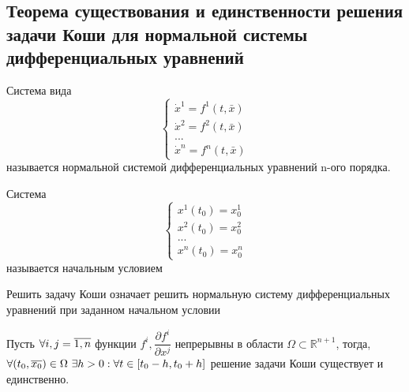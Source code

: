 \subsection{Теорема существования и единственности решения задачи Коши для нормальной системы дифференциальных уравнений}

\begin{definition}
    Система вида
    \begin{equation}
        \label{equ:norm-sys}
        \begin{cases*}
            \dot{x}^1 = f^1(t, \bar{x}) \\
            \dot{x}^2 = f^2(t, \bar{x}) \\
            ...                         \\
            \dot{x}^n = f^n(t, \bar{x})
        \end{cases*}
    \end{equation}
    называется нормальной системой дифференциальных уравнений n-ого порядка.
    
\end{definition}

\begin{definition}
    Система
    \begin{equation}
        \label{equ:init-cond}
        \begin{cases*}
            x^1(t_0) = x_0^1 \\
            x^2(t_0) = x_0^2 \\
            ...              \\
            x^n(t_0) = x_0^n
        \end{cases*}
    \end{equation}
    называется начальным условием
\end{definition}	

\begin{proposition}
    Решить задачу Коши означает решить нормальную систему дифференциальных уравнений при заданном начальном условии
\end{proposition}

\begin{theorem} \label{ОсновнаяТеорема}
    Пусть $\forall i, j \hm= \overline{1, n}$ функции $f^i, \dfrac{\partial{f^i}}{\partial{x^j}}$ непрерывны в области $\Omega \subset \mathbb{R}^{n+1}$, тогда, $\forall (t_0, \overline{x_0}) \in \Omega \text{ } \exists h>0 : \forall t \hm\in [t_0-h, t_0+h]$ решение задачи Коши существует и единственно.
\end{theorem}

